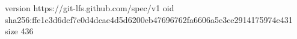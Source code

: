 version https://git-lfs.github.com/spec/v1
oid sha256:ffe1c3d6dcf7e0d4dcae4d5d6200eb47696762fa6606a5e3ce2914175974e431
size 436
